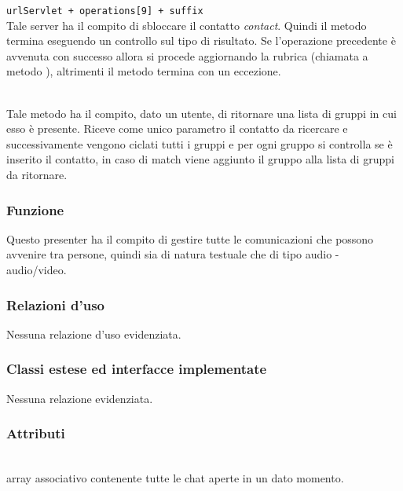 \begin{description}
\verb|urlServlet + operations[9] + suffix|\\

Tale server ha il compito di sbloccare il contatto \textit{contact}. Quindi il metodo termina eseguendo un controllo sul tipo di risultato. Se l'operazione precedente è avvenuta con successo allora si procede aggiornando la rubrica (chiamata a metodo ), altrimenti il metodo termina con un eccezione.

\item{}\\
Tale metodo ha il compito, dato un utente, di ritornare una lista di gruppi in cui esso è presente. Riceve come unico parametro il contatto da ricercare e successivamente vengono ciclati tutti i gruppi e per ogni gruppo si controlla se è inserito il contatto, in caso di match viene aggiunto il gruppo alla lista di gruppi da ritornare.

\end{description}


\subsubsection*{Funzione}
Questo presenter ha il compito di gestire tutte le comunicazioni che possono avvenire tra persone, quindi sia di natura testuale che di tipo audio - audio/video.

\subsubsection*{Relazioni d'uso}
Nessuna relazione d'uso evidenziata.

\subsubsection*{Classi estese ed interfacce implementate}

Nessuna relazione evidenziata.

\subsubsection*{Attributi}
\begin{description}
\item{}\\
  array associativo contenente tutte le chat aperte in un dato momento.
\end{description}

